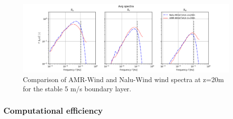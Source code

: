 \begin{figure} %
  \centering
  \includegraphics[width=7.0in]{figures/Compare_AMRWind_NaluWind/AMRWind_NaluWind_Spectra_Stable_z20.png}

  \caption{\label{fig:CompareAMRvsNaluSpectra} Comparison of AMR-Wind
    and Nalu-Wind wind spectra at z=20m for the stable 5 m/s boundary
    layer. }
\end{figure}




\subsubsection{Computational efficiency}

